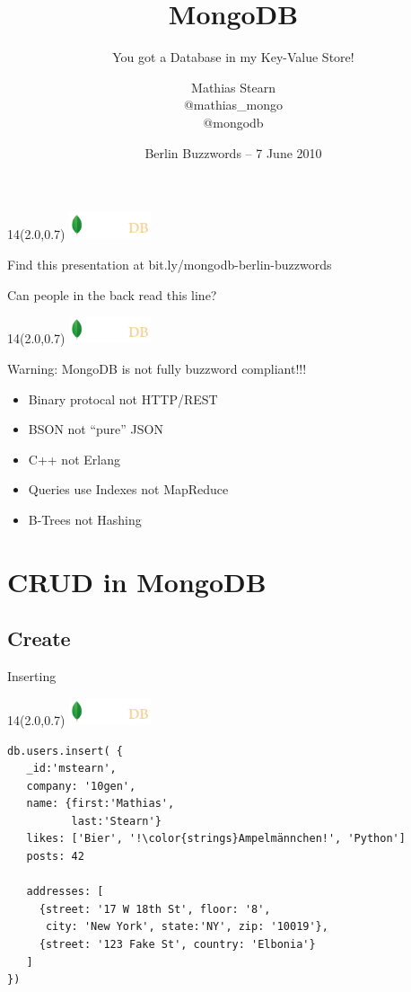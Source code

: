 \documentclass{beamer}
\title{MongoDB}
\subtitle{You got a Database in my Key-Value Store!}
\author{Mathias Stearn \\ @mathias\_mongo \\ @mongodb}
\institute{ \includegraphics[height=0.8cm]{10gen.png} }
\date{Berlin Buzzwords -- 7 June 2010}
\newcommand{\MongoLogo}{
\begin{textblock}{14}(2.0,0.7)
  \includegraphics[height=0.8cm]{logo-mongodb-ondark.png}
\end{textblock}
}
\begin{document}
\begin{frame}
  \MongoLogo
  \titlepage
  
  \begin{center}
    Find this presentation at bit.ly/mongodb-berlin-buzzwords

    \small Can people in the back read this line?
  \end{center}
\end{frame}


\begin{frame}
  \MongoLogo

  \begin{block}{ {\color{red} Warning:} MongoDB is not fully buzzword compliant!!!}
    \begin{itemize}
      \item Binary protocal not HTTP/REST
      \item BSON not ``pure'' JSON
      \item C++ not Erlang
      \item Queries use Indexes not MapReduce
      \item B-Trees not Hashing
    \end{itemize}
    
  \end{block}

\end{frame}

\section{CRUD in MongoDB}

\subsection{Create}
\begin{frame}[fragile]{Inserting}
  \MongoLogo

\begin{lstlisting}
db.users.insert( {
   _id:'mstearn',
   company: '10gen',
   name: {first:'Mathias',
          last:'Stearn'}
   likes: ['Bier', '!\color{strings}Ampelmännchen!', 'Python']
   posts: 42

   addresses: [
     {street: '17 W 18th St', floor: '8',
      city: 'New York', state:'NY', zip: '10019'},
     {street: '123 Fake St', country: 'Elbonia'}
   ]
})
\end{lstlisting}
\end{frame}
\end{document}
